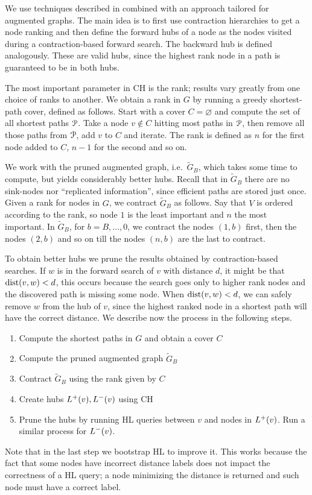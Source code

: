 We use techniques described in \cite{hubimplem} combined with an approach tailored for augmented graphs.
The main idea is to first use contraction hierarchies to get a node ranking and then define the forward hubs of a node as the nodes visited during a contraction-based forward search.
The backward hub is defined analogously.
These are valid hubs, since the highest rank node in a path is guaranteed to be in both hubs.

The most important parameter in CH is the rank; results vary greatly from one choice of ranks to another.
We obtain a rank in $G$ by running a greedy shortest-path cover, defined as follows.
Start with a cover $C=\varnothing$ and compute the set of all shortest paths $\mathcal{P}$.
Take a node $v\notin C$ hitting most paths in $\mathcal{P}$, then remove all those paths from $\mathcal{P}$, add $v$ to $C$ and iterate.
The rank is defined as $n$ for the first node added to $C$, $n-1$ for the second and so on.

We work with the pruned augmented graph, i.e.\ $\tilde G_B$, which takes some time to compute, but yields considerably better hubs. 
Recall that in $\tilde G_B$ there are no sink-nodes nor ``replicated information'', since efficient paths are stored just once.
Given a rank for nodes in $G$, we contract $\tilde G_B$ as follows.
Say that $V$ is ordered according to the rank, so node $1$ is the least important and $n$ the most important.
In $\tilde G_B$, for $b=B,\ldots,0$, we contract the nodes $(1,b)$ first, then the nodes $(2,b)$ and so on till the nodes $(n,b)$ are the last to contract. 

To obtain better hubs we prune the results obtained by contraction-based searches.
If $w$ is in the forward search of $v$ with distance $d$, it might be that $\text{dist}(v,w)<d$, this occurs because the search goes only to higher rank nodes and the discovered path is missing some node.
When $\text{dist}(v,w)<d$, we can safely remove $w$ from the hub of $v$, since the highest ranked node in a shortest path will have the correct distance.
We describe now the process in the following steps.

\begin{enumerate}[nosep]
\item Compute the shortest paths in $G$ and obtain a cover $C$
\item Compute the pruned augmented graph $\tilde G_B$
\item Contract $\tilde G_B$ using the rank given by $C$
\item Create hubs $L^+(v),L^-(v)$ using CH
\item Prune the hubs by running HL queries between $v$ and nodes in $L^+(v)$. 
Run a similar process for $L^-(v)$.
\end{enumerate}
Note that in the last step we bootstrap HL to improve it.
This works because the fact that some nodes have incorrect distance labels does not impact the correctness of a HL query; a node minimizing the distance is returned and such node must have a correct label.

